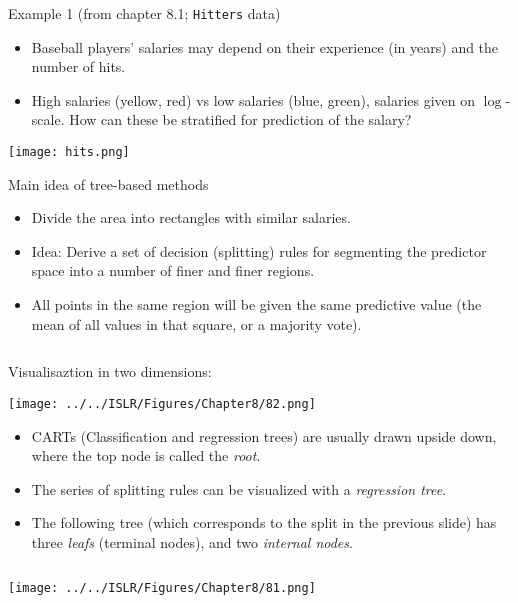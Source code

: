 \documentclass[
  10pt,
  ignorenonframetext,
]{beamer}
\begin{document}
\begin{frame}[fragile]
\begin{block}{Example 1 (from chapter 8.1; \texttt{Hitters} data)}
\protect\hypertarget{example-1-from-chapter-8.1-hitters-data}{}
\vspace{1mm}

\begin{itemize}
\item
  Baseball players' salaries may depend on their experience (in years)
  and the number of hits.
\item
  High salaries (yellow, red) vs low salaries (blue, green), salaries
  given on \(\log\)-scale. How can these be stratified for prediction of
  the salary?
\end{itemize}

\centering

\texttt{[image: hits.png]}
\end{block}
\end{frame}

\begin{frame}
\begin{block}{Main idea of tree-based methods}
\protect\hypertarget{main-idea-of-tree-based-methods}{}
\vspace{2mm}

\begin{itemize}
\item
  Divide the area into rectangles with similar salaries.
\item
  Idea: Derive a set of decision (splitting) rules for segmenting the
  predictor space into a number of finer and finer regions.
\item
  All points in the same region will be given the same predictive value
  (the mean of all values in that square, or a majority vote).
\end{itemize}

\(~\)

Visualisaztion in two dimensions:

\centering

\texttt{[image: ../../ISLR/Figures/Chapter8/82.png]}
\end{block}
\end{frame}

\begin{frame}
\begin{itemize}
\item
  CARTs (Classification and regression trees) are usually drawn upside
  down, where the top node is called the \emph{root}.
\item
  The series of splitting rules can be visualized with a
  \emph{regression tree}.
\item
  The following tree (which corresponds to the split in the previous
  slide) has three \emph{leafs} (terminal nodes), and two \emph{internal
  nodes}.
\end{itemize}

\(~\)

\centering

\texttt{[image: ../../ISLR/Figures/Chapter8/81.png]}
\end{frame}
\end{document}
